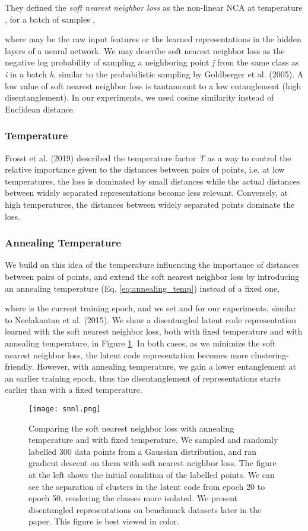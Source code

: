 \documentclass[conference]{IEEEtran}
\begin{document}
They defined the \textit{soft nearest neighbor loss} as the non-linear NCA at temperature , for a batch of  samples ,


where  may be the raw input features or the learned representations in the hidden layers of a neural network. We may describe soft nearest neighbor loss as the negative log probability of sampling a neighboring point \textit{j} from the same class as \textit{i} in a batch \textit{b}, similar to the probabilistic sampling by Goldberger et al. (2005)\cite{goldberger2005neighbourhood}. A low value of soft nearest neighbor loss is tantamount to a low entanglement (high disentanglement). In our experiments, we used cosine similarity instead of Euclidean distance.
\subsubsection{Temperature} Frosst et al. (2019)\cite{frosst2019analyzing} described the temperature factor \textit{T} as a way to control the relative importance given to the distances between pairs of points, i.e. at low temperatures, the loss is dominated by small distances while the actual distances between widely separated representations become less relevant. Conversely, at high temperatures, the distances between widely separated points dominate the loss.

\subsubsection{Annealing Temperature} We build on this idea of the temperature influencing the importance of distances between pairs of points, and extend the soft nearest neighbor loss by introducing an annealing temperature (Eq. \ref{eq:annealing_temp}) instead of a fixed one,

where  is the current training epoch, and we set  and  for our experiments, similar to Neelakantan et al. (2015)\cite{neelakantan2015adding}. We show a disentangled latent code representation learned with the soft nearest neighbor loss, both with fixed temperature and with annealing temperature, in Figure \ref{fig:synthetic_snnl}. In both cases, as we minimize the soft nearest neighbor loss, the latent code representation becomes more clustering-friendly. However, with annealing temperature, we gain a lower entanglement at an earlier training epoch, thus the disentanglement of representations starts earlier than with a fixed temperature.

\begin{figure}[htb!]
    \centering
    \texttt{[image: snnl.png]}
    \caption{Comparing the soft nearest neighbor loss with annealing temperature and with fixed temperature. We sampled and randomly labelled 300 data points from a Gaussian distribution, and ran gradient descent on them with soft nearest neighbor loss. The figure at the left shows the initial condition of the labelled points. We can see the separation of clusters in the latent code from epoch 20 to epoch 50, rendering the classes more isolated. We present disentangled representations on benchmark datasets later in the paper. This figure is best viewed in color.}
    \label{fig:synthetic_snnl}
\end{figure}
\end{document}

